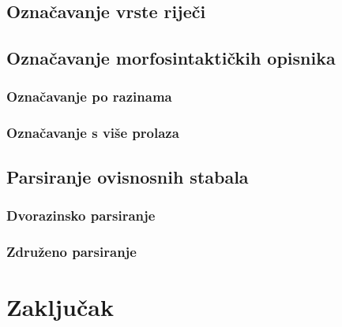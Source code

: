\documentclass[times, utf8, diplomski]{fer}
\begin{document}
\section{Označavanje vrste riječi}

\section{Označavanje morfosintaktičkih opisnika}

\subsection{Označavanje po razinama}

\subsection{Označavanje s više prolaza}

\section{Parsiranje ovisnosnih stabala}

\subsection{Dvorazinsko parsiranje}

\subsection{Združeno parsiranje}

\chapter{Zaključak}









\nocite{daume06thesis}
\nocite{daume09searn}
\nocite{daume06searn-practice}
\nocite{daume15reductions}
\nocite{daume15lols}
\nocite{daume15rewrite}
\nocite{daume14lts}
\end{document}

